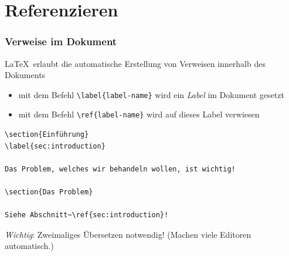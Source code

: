 
\subtitle{Nummerierung, Referenzierung, Bibliographie}
\date{2017-05-16}



\section{Referenzieren}

\begin{frame}[fragile]
  \frametitle{Verweise im Dokument}

  \onslide<+->

  \LaTeX\ erlaubt die automatische Erstellung von Verweisen innerhalb des Dokuments

  \begin{itemize}
  \item<+-> mit dem Befehl \lstinline!\label{label-name}! wird ein \emph{Label} im Dokument
    gesetzt
  \item<+-> mit dem Befehl \lstinline!\ref{label-name}! wird auf dieses Label verwiesen
  \end{itemize}

  \onslide<+->

\begin{lstlisting}
\section{Einführung}
\label{sec:introduction}

Das Problem, welches wir behandeln wollen, ist wichtig!

\section{Das Problem}

Siehe Abschnitt~\ref{sec:introduction}!
\end{lstlisting}

  \onslide<+->

  \emph{Wichtig}: Zweimaliges Übersetzen notwendig! (Machen viele Editoren automatisch.)

\end{frame}

